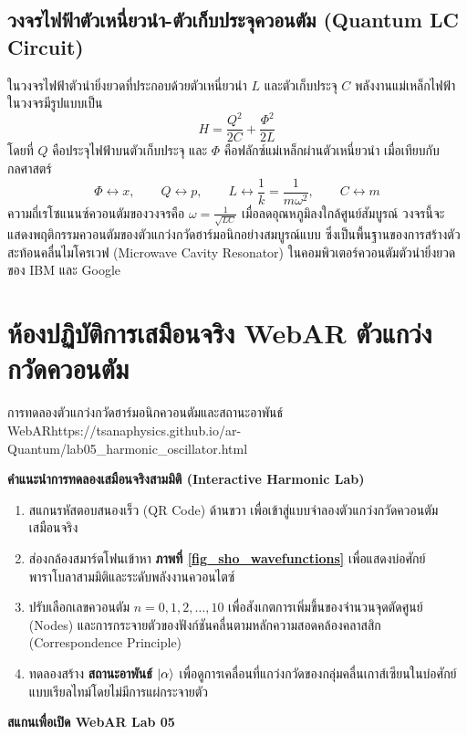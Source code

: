 \subsection{วงจรไฟฟ้าตัวเหนี่ยวนำ-ตัวเก็บประจุควอนตัม (Quantum LC Circuit)}
ในวงจรไฟฟ้าตัวนำยิ่งยวดที่ประกอบด้วยตัวเหนี่ยวนำ $L$ และตัวเก็บประจุ $C$ พลังงานแม่เหล็กไฟฟ้าในวงจรมีรูปแบบเป็น
\begin{equation}
H = \frac{Q^2}{2C} + \frac{\Phi^2}{2L}
\end{equation}
โดยที่ $Q$ คือประจุไฟฟ้าบนตัวเก็บประจุ และ $\Phi$ คือฟลักซ์แม่เหล็กผ่านตัวเหนี่ยวนำ เมื่อเทียบกับกลศาสตร์
\begin{equation}
\Phi \longleftrightarrow x, \qquad Q \longleftrightarrow p, \qquad L \longleftrightarrow \frac{1}{k} = \frac{1}{m\omega^2}, \qquad C \longleftrightarrow m
\end{equation}
ความถี่เรโซแนนซ์ควอนตัมของวงจรคือ $\omega = \frac{1}{\sqrt{LC}}$ เมื่อลดอุณหภูมิลงใกล้ศูนย์สัมบูรณ์ วงจรนี้จะแสดงพฤติกรรมควอนตัมของตัวแกว่งกวัดฮาร์มอนิกอย่างสมบูรณ์แบบ ซึ่งเป็นพื้นฐานของการสร้างตัวสะท้อนคลื่นไมโครเวฟ (Microwave Cavity Resonator) ในคอมพิวเตอร์ควอนตัมตัวนำยิ่งยวดของ IBM และ Google

\section{ห้องปฏิบัติการเสมือนจริง WebAR ตัวแกว่งกวัดควอนตัม}
\label{sec_webar_lab05}

\begin{qrcodelabbox}{การทดลองตัวแกว่งกวัดฮาร์มอนิกควอนตัมและสถานะอาพันธ์ WebAR}{https://tsanaphysics.github.io/ar-Quantum/lab05_harmonic_oscillator.html}
\begin{minipage}[c]{0.70\textwidth}
\textbf{คำแนะนำการทดลองเสมือนจริงสามมิติ (Interactive Harmonic Lab)}
\begin{enumerate}
    \item สแกนรหัสตอบสนองเร็ว (QR Code) ด้านขวา เพื่อเข้าสู่แบบจำลองตัวแกว่งกวัดควอนตัมเสมือนจริง
    \item ส่องกล้องสมาร์ตโฟนเข้าหา \textbf{ภาพที่ \ref{fig_sho_wavefunctions}} เพื่อแสดงบ่อศักย์พาราโบลาสามมิติและระดับพลังงานควอนไตซ์
    \item ปรับเลือกเลขควอนตัม $n = 0, 1, 2, \dots, 10$ เพื่อสังเกตการเพิ่มขึ้นของจำนวนจุดตัดศูนย์ (Nodes) และการกระจายตัวของฟังก์ชันคลื่นตามหลักความสอดคล้องคลาสสิก (Correspondence Principle)
    \item ทดลองสร้าง \textbf{สถานะอาพันธ์ $\ket{\alpha}$} เพื่อดูการเคลื่อนที่แกว่งกวัดของกลุ่มคลื่นเกาส์เซียนในบ่อศักย์แบบเรียลไทม์โดยไม่มีการแผ่กระจายตัว
\end{enumerate}
\end{minipage}
\hfill
\begin{minipage}[c]{0.25\textwidth}
\centering
{}
\vspace{4pt}
\scriptsize\textbf{สแกนเพื่อเปิด WebAR Lab 05}
\end{minipage}
\end{qrcodelabbox}

